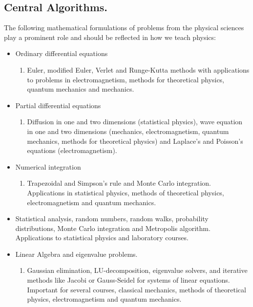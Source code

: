 \documentclass[graybox,envcountchap,sectrefs]{svmult}
\begin{document}
\subsection{Central Algorithms.}
The following mathematical formulations of problems from the physical sciences play a prominent role and should be reflected in how we teach physics:
\begin{itemize}
\item Ordinary differential equations
\begin{enumerate}

  \item Euler, modified Euler, Verlet and Runge-Kutta methods with applications to problems in electromagnetism, methods for theoretical physics, quantum mechanics and mechanics.

\end{enumerate}


\item Partial differential equations
\begin{enumerate}

  \item Diffusion in one and two dimensions (statistical physics), wave equation in one and two dimensions (mechanics, electromagnetism, quantum mechanics, methods for theoretical physics) and Laplace's and Poisson's equations (electromagnetism).

\end{enumerate}


\item Numerical integration
\begin{enumerate}

  \item Trapezoidal and Simpson's rule and Monte Carlo integration. Applications in statistical physics, methods of theoretical physics, electromagnetism and quantum mechanics.

\end{enumerate}


\item Statistical analysis, random numbers, random walks, probability distributions, Monte Carlo integration and Metropolis algorithm. Applications to statistical physics and laboratory courses.

\item Linear Algebra and eigenvalue problems.
\begin{enumerate}

  \item Gaussian elimination, LU-decomposition, eigenvalue solvers, and iterative methods like  Jacobi or Gauss-Seidel for systems of linear equations. Important for several courses, classical mechanics, methods of theoretical physics, electromagnetism and quantum mechanics.


\end{enumerate}
\end{itemize}
\end{document}
